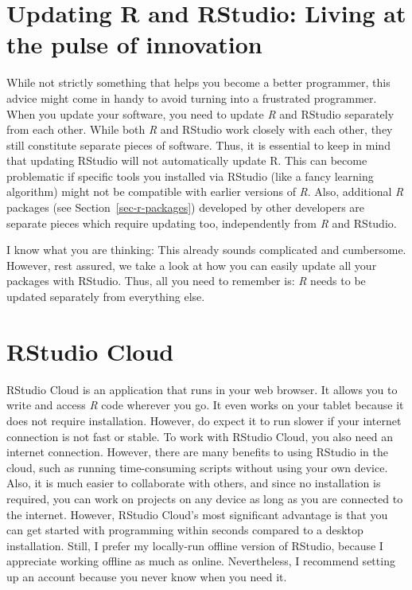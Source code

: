 \documentclass[
  letterpaper,
]{krantz}
\begin{document}
\section{Updating R and RStudio: Living at the pulse of
innovation}\label{sec-updating-r-and-rstudio}

While not strictly something that helps you become a better programmer,
this advice might come in handy to avoid turning into a frustrated
programmer. When you update your software, you need to update \emph{R}
and RStudio separately from each other. While both \emph{R} and RStudio
work closely with each other, they still constitute separate pieces of
software. Thus, it is essential to keep in mind that updating RStudio
will not automatically update R. This can become problematic if specific
tools you installed via RStudio (like a fancy learning algorithm) might
not be compatible with earlier versions of \emph{R}. Also, additional
\emph{R} packages (see Section~\ref{sec-r-packages}) developed by other
developers are separate pieces which require updating too, independently
from \emph{R} and RStudio.

I know what you are thinking: This already sounds complicated and
cumbersome. However, rest assured, we take a look at how you can easily
update all your packages with RStudio. Thus, all you need to remember
is: \emph{R} needs to be updated separately from everything else.

\section{RStudio Cloud}\label{sec-rstudio-cloud}

RStudio Cloud is an application that runs in your web browser. It allows
you to write and access \emph{R} code wherever you go. It even works on
your tablet because it does not require installation. However, do expect
it to run slower if your internet connection is not fast or stable. To
work with RStudio Cloud, you also need an internet connection. However,
there are many benefits to using RStudio in the cloud, such as running
time-consuming scripts without using your own device. Also, it is much
easier to collaborate with others, and since no installation is
required, you can work on projects on any device as long as you are
connected to the internet. However, RStudio Cloud's most significant
advantage is that you can get started with programming within seconds
compared to a desktop installation. Still, I prefer my locally-run
offline version of RStudio, because I appreciate working offline as much
as online. Nevertheless, I recommend setting up an account because you
never know when you need it.
\end{document}

